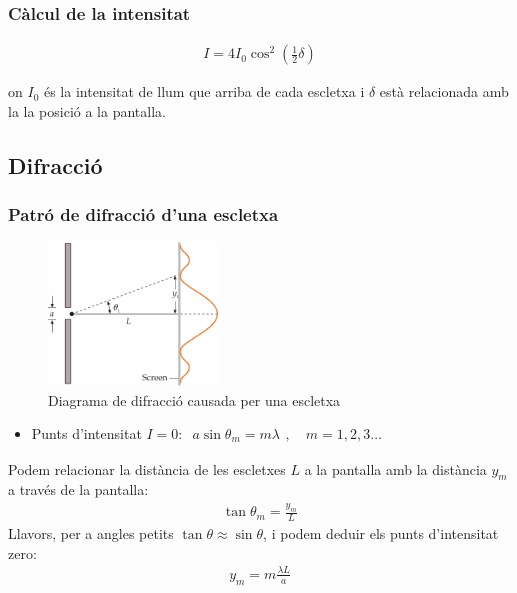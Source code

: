 \subsubsection*{Càlcul de la intensitat}
\begin{align}
    \boxed{I = 4 I_{0} \cos^2 \left( \frac{1}{2} \delta \right)}
\end{align}

on $I_{0}$ és la intensitat de llum que arriba de cada escletxa i $\delta$ està relacionada amb la la posició a la pantalla.

\subsection{Difracció}
\subsubsection*{Patró de difracció d'una escletxa}
\begin{figure}[H]
\centering
    \includegraphics[width=0.4\textwidth]{images/6/65-dif-una.png}
\caption{Diagrama de difracció causada per una escletxa}
\end{figure}
\begin{itemize}
    \item Punts d'intensitat $I=0$: $\begin{gathered} \boxed{a \sin \theta_{m} = m \lambda} \end{gathered}, \quad m = 1, 2, 3 \dots$
\end{itemize}
Podem relacionar la distància de les escletxes $L$ a la pantalla amb la distància $y_{m}$ a través de la pantalla:
\begin{align}
    \tan \theta_{m} = \frac{y_{m}}{L}
\end{align}
Llavors, per a angles petits $\tan \theta \approx \sin \theta$, i podem deduir els punts d'intensitat zero:
\begin{align}
    \boxed{y_{m} = m \frac{\lambda L}{a}}
\end{align}

